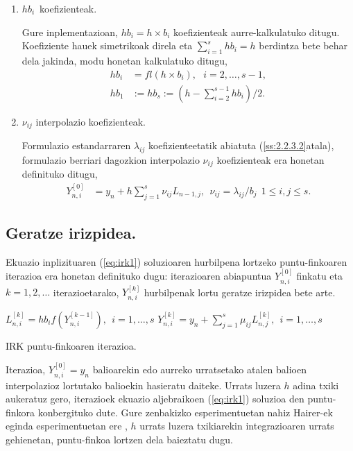 \begin{enumerate}
\item $hb_{i}$~koefizienteak.

Gure inplementazioan, $hb_i=h \times b_i$ koefizienteak aurre-kalkulatuko ditugu. Koefiziente hauek simetrikoak direla eta  $\sum\limits_{i=1}^{s} hb_i=h$ berdintza bete behar dela jakinda, modu honetan kalkulatuko ditugu,
\begin{align*}
hb_i & = fl(h \times b_i), \ \ \ i=2,\dots,s-1, \\
hb_1 & :=hb_s:= \left(h - \sum\limits_{i=2}^{s-1} hb_i \right)/2.
\end{align*}

\item $\nu_{ij}$ interpolazio koefizienteak.

Formulazio estandarraren $\lambda_{ij}$ koefizienteetatik abiatuta (\ref{ss:2.2.3.2}atala), formulazio berriari dagozkion interpolazio $\nu_{ij}$ koefizienteak era honetan definituko ditugu,
\begin{align}
\label{eq: interpLi}
Y_{n,i}^{[0]} &= y_n+ h \sum\limits_{j=1}^{s} \nu_{ij} L_{n-1,j}, \ \ \nu_{ij}=\lambda_{ij}/b_j \ \ 1\leqslant i,j \leqslant s.
\end{align} 

\end{enumerate}

\subsection{Geratze irizpidea.}

Ekuazio inplizituaren (\ref{eq:irk1}) soluzioaren hurbilpena lortzeko puntu-finkoaren iterazioa era honetan definituko dugu: iterazioaren abiapuntua $Y_{n,i}^{[0]}$  finkatu eta $k=1,2,\dots$ iterazioetarako, $Y_{n,i}^{[k]}$ hurbilpenak lortu geratze irizpidea bete arte.


\begin{algorithm}[H]
  {
  \BlankLine
   $L_{n,i}^{[k]}=hb_if(Y_{n,i}^{[k-1]}), \ \  i=1,\dots,s $\;
   $Y_{n,i}^{[k]}=y_n+\sum\limits_{j=1}^{s} \mu_{ij} L_{n,j}^{[k]} , \ \  i=1,\dots,s $\; 
   }
 \caption{IRK puntu-finkoaren iterazioa.}
 \label{alg:pf}
\end{algorithm}
 
Iterazioa,  $Y_{n,i}^{[0]}=y_n$ balioarekin edo aurreko urratsetako atalen balioen interpolazioz lortutako balioekin \cite{Hairer2006}  hasieratu daiteke.  Urrats luzera $h$ adina txiki aukeratuz gero, iterazioek ekuazio aljebraikoen (\ref{eq:irk1}) soluzioa den puntu-finkora konbergituko dute. Gure zenbakizko esperimentuetan nahiz Hairer-ek eginda esperimentuetan ere \cite{Hairer2008}, $h$ urrats luzera txikiarekin integrazioaren urrats gehienetan, puntu-finkoa lortzen dela baieztatu dugu.    
 
